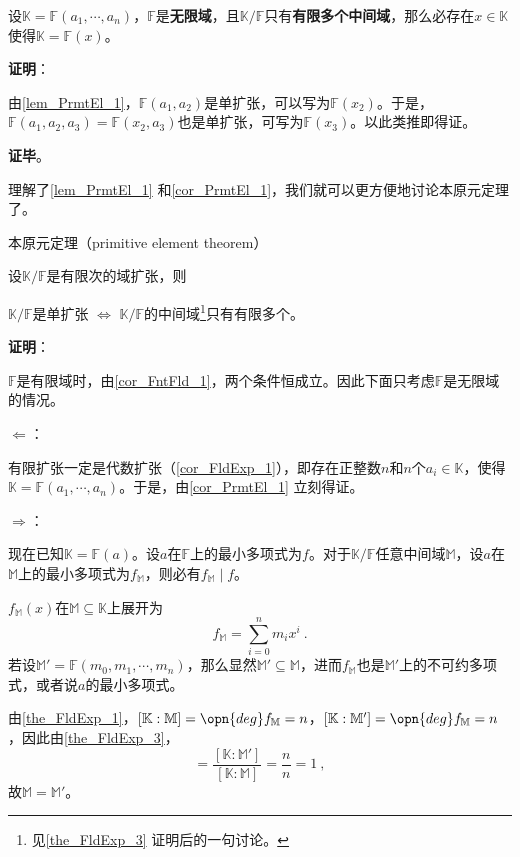 \begin{corollary}{}\label{cor_PrmtEl_1}
设$\mathbb{K}=\mathbb{F}(a_1, \cdots, a_n)$，$\mathbb{F}$是\textbf{无限域}，且$\mathbb{K}/\mathbb{F}$只有\textbf{有限多个中间域}，那么必存在$x\in\mathbb{K}$使得$\mathbb{K}=\mathbb{F}(x)$。
\end{corollary}

\textbf{证明}：

由\autoref{lem_PrmtEl_1}，$\mathbb{F}(a_1, a_2)$是单扩张，可以写为$\mathbb{F}(x_2)$。于是，$\mathbb{F}(a_1, a_2, a_3)=\mathbb{F}(x_2, a_3)$也是单扩张，可写为$\mathbb{F}(x_3)$。以此类推即得证。

\textbf{证毕}。


理解了\autoref{lem_PrmtEl_1} 和\autoref{cor_PrmtEl_1}，我们就可以更方便地讨论本原元定理了。


\begin{theorem}{本原元定理（primitive element theorem）}\label{the_PrmtEl_1}

设$\mathbb{K}/\mathbb{F}$是有限次的域扩张，则

$\mathbb{K}/\mathbb{F}$是单扩张 $\iff$ $\mathbb{K}/\mathbb{F}$的中间域\footnote{见\autoref{the_FldExp_3} 证明后的一句讨论。}只有有限多个。

\end{theorem}

\textbf{证明}：

$\mathbb{F}$是有限域时，由\autoref{cor_FntFld_1}，两个条件恒成立。因此下面只考虑$\mathbb{F}$是无限域的情况。

$\Leftarrow$：

有限扩张一定是代数扩张（\autoref{cor_FldExp_1}），即存在正整数$n$和$n$个$a_i\in\mathbb{K}$，使得$\mathbb{K}=\mathbb{F}(a_1, \cdots, a_n)$。于是，由\autoref{cor_PrmtEl_1} 立刻得证。

$\Rightarrow$：

现在已知$\mathbb{K}=\mathbb{F}(a)$。设$a$在$\mathbb{F}$上的最小多项式为$f$。对于$\mathbb{K}/\mathbb{F}$任意中间域$\mathbb{M}$，设$a$在$\mathbb{M}$上的最小多项式为$f_\mathbb{M}$，则必有$f_{\mathbb{M}}\mid f$。

$f_\mathbb{M}(x)$在$\mathbb{M}\subseteq\mathbb{K}$上展开为
\begin{equation}
f_\mathbb{M} = \sum_{i=0}^n m_ix^i~.
\end{equation}
若设$\mathbb{M}'=\mathbb{F}(m_0, m_1, \cdots, m_n)$，那么显然$\mathbb{M}'\subseteq\mathbb{M}$，进而$f_\mathbb{M}$也是$\mathbb{M}'$上的不可约多项式，或者说$a$的最小多项式。

由\autoref{the_FldExp_1}，$[\mathbb{K}:\mathbb{M}]=\opn{deg}f_\mathbb{M}=n$，$[\mathbb{K}:\mathbb{M}']=\opn{deg}f_\mathbb{M}=n$，因此由\autoref{the_FldExp_3}，
\begin{equation}
[\mathbb{M}:\mathbb{M}']=\frac{[\mathbb{K}:\mathbb{M}']}{[\mathbb{K}:\mathbb{M}]}=\frac{n}{n}=1~,
\end{equation}
故$\mathbb{M}=\mathbb{M}'$。

